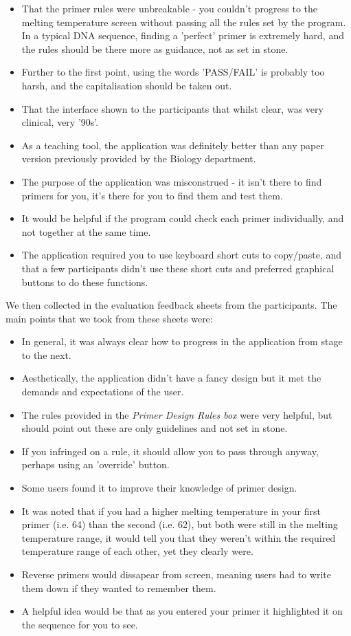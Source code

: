 \begin{itemize}

\item That the primer rules were unbreakable - you couldn't progress to the melting temperature screen without passing all the rules set by the program. In a typical DNA sequence, finding a 'perfect' primer is extremely hard, and the rules should be there more as guidance, not as set in stone.
\item Further to the first point, using the words 'PASS/FAIL' is probably too harsh, and the capitalisation should be taken out.
\item That the interface shown to the participants that whilst clear, was very clinical, very '90s'.
\item As a teaching tool, the application was definitely better than any paper version previously provided by the Biology department.
\item The purpose of the application was misconstrued - it isn't there to find primers for you, it's there for you to find them and test them.
\item It would be helpful if the program could check each primer individually, and not together at the same time.
\item The application required you to use keyboard short cuts to copy/paste, and that a few participants didn't use these short cuts and preferred graphical buttons to do these functions.
\end{itemize}

We then collected in the evaluation feedback sheets from the participants. The main points that we took from these sheets were:

\begin{itemize}

\item In general, it was always clear how to progress in the application from stage to the next.
\item Aesthetically, the application didn't have a fancy design but it met the demands and expectations of the user.
\item The rules provided in the \emph{Primer Design Rules box} were very helpful, but should point out these are only guidelines and not set in stone.
\item If you infringed on a rule, it should allow you to pass through anyway, perhaps using an 'override' button.
\item Some users found it to improve their knowledge of primer design.
\item It was noted that if you had a higher melting temperature in your first primer (i.e. 64) than the second (i.e. 62), but both were still in the melting temperature range, it would tell you that they weren't within the required temperature range of each other, yet they clearly were.
\item Reverse primers would dissapear from screen, meaning users had to write them down if they wanted to remember them.
\item A helpful idea would be that as you entered your primer it highlighted it on the sequence for you to see.

\end{itemize}


